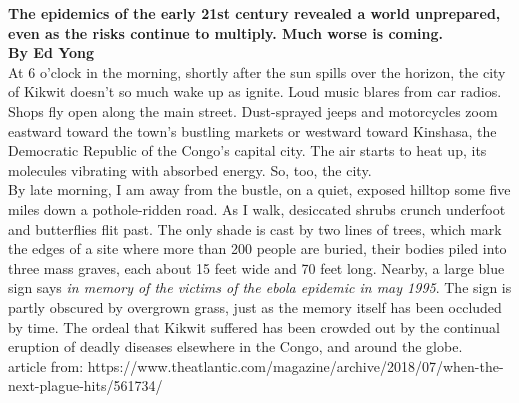\documentclass{article}
\begin{document}
\textbf{The epidemics of the early 21st century revealed a world unprepared, even as the risks continue to multiply. Much worse is coming.} \\

\textbf{By Ed Yong}\\

At 6 o’clock in the morning, shortly after the sun spills over the horizon, the city of Kikwit doesn’t so much wake up as ignite. Loud music blares from car radios. Shops fly open along the main street. Dust-sprayed jeeps and motorcycles zoom eastward toward the town’s bustling markets or westward toward Kinshasa, the Democratic Republic of the Congo’s capital city. The air starts to heat up, its molecules vibrating with absorbed energy. So, too, the city. \\

By late morning, I am away from the bustle, on a quiet, exposed hilltop some five miles down a pothole-ridden road. As I walk, desiccated shrubs crunch underfoot and butterflies flit past. The only shade is cast by two lines of trees, which mark the edges of a site where more than 200 people are buried, their bodies piled into three mass graves, each about 15 feet wide and 70 feet long. Nearby, a large blue sign says \textit{in memory of the victims of the ebola epidemic in may 1995}. The sign is partly obscured by overgrown grass, just as the memory itself has been occluded by time. The ordeal that Kikwit suffered has been crowded out by the continual eruption of deadly diseases elsewhere in the Congo, and around the globe. \\

article from: https://www.theatlantic.com/magazine/archive/2018/07/when-the-next-plague-hits/561734/
\end{document}
